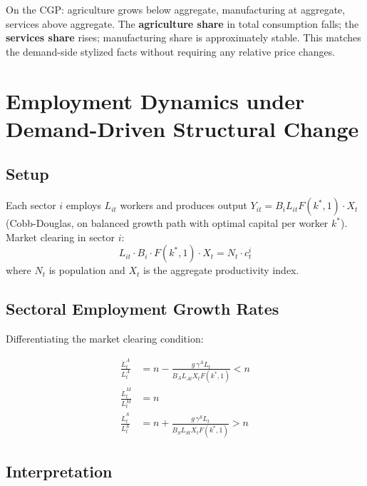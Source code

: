 \documentclass[a4paper,11pt]{article}
\begin{document}
\begin{resultbox}
On the CGP: agriculture grows below aggregate, manufacturing at aggregate, services above aggregate. The \textbf{agriculture share} in total consumption falls; the \textbf{services share} rises; manufacturing share is approximately stable. This matches the demand-side stylized facts without requiring any relative price changes.
\end{resultbox}

\clearpage

\section{Employment Dynamics under Demand-Driven Structural Change}

\subsection*{Setup}

Each sector $i$ employs $L_{it}$ workers and produces output $Y_{it} = B_i L_{it} F(k^*, 1) \cdot X_t$ (Cobb-Douglas, on balanced growth path with optimal capital per worker $k^*$). Market clearing in sector $i$:
\[
L_{it} \cdot B_i \cdot F(k^*, 1) \cdot X_t = N_t \cdot c_t^i
\]
where $N_t$ is population and $X_t$ is the aggregate productivity index.

\subsection*{Sectoral Employment Growth Rates}

Differentiating the market clearing condition:

\begin{keyformulabox}[title={Employment Growth Rates on the CGP}]
\begin{align*}
\frac{\dot{L}_t^A}{L_t^A} &= n - \frac{g\, \gamma^A L_t}{B_A L_{At} X_t F(k^*,1)} < n
\tag{Agriculture} \\[0.5em]
\frac{\dot{L}_t^M}{L_t^M} &= n
\tag{Manufacturing} \\[0.5em]
\frac{\dot{L}_t^S}{L_t^S} &= n + \frac{g\, \gamma^S L_t}{B_S L_{St} X_t F(k^*,1)} > n
\tag{Services}
\end{align*}
\end{keyformulabox}

\subsection*{Interpretation}
\end{document}

